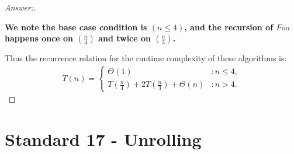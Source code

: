 \documentclass[11pt]{article}
\theoremstyle{definition}
\theoremstyle{definition}
\theoremstyle{definition}
\begin{document}
\begin{proof}[Answer:] \
\item \textbf{We note the base case condition is $(n \leq 4)$, and the recursion of $Foo$ happens once on $(\frac{n}{4})$ and twice on $(\frac{n}{3})$.}
\item Thus the recurrence relation for the runtime complexity of these algorithms is: \\ 
\begin{align*}
T(n) = \begin{cases}
\Theta(1) & : n \leq 4, \\
T(\frac{n}{4}) + 2T(\frac{n}{3}) + \Theta(n) & : n > 4.
\end{cases}
\end{align*}
\end{proof}

\newpage

\section{Standard 17 - Unrolling}
\end{document}
